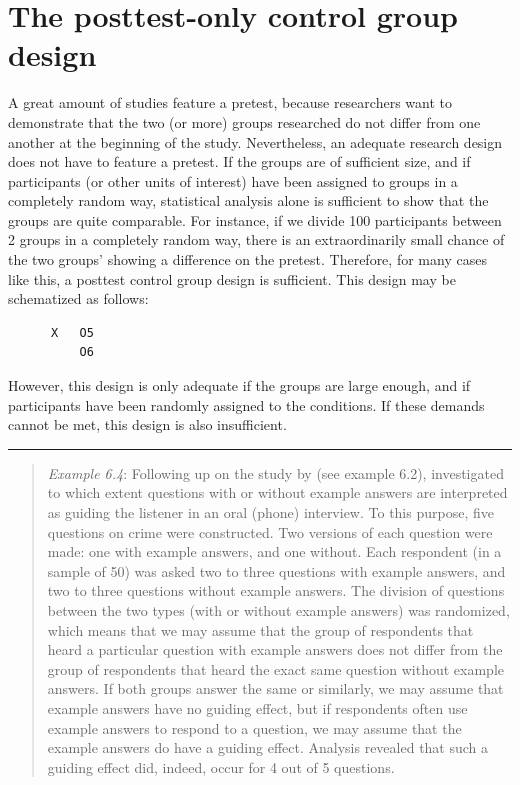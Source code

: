 \documentclass[
]{book}
\begin{document}
\hypertarget{the-posttest-only-control-group-design}{%
\section{The posttest-only control group design}\label{the-posttest-only-control-group-design}}

A great amount of studies feature a pretest, because researchers want to demonstrate that the two (or more) groups researched do not differ from one another at the beginning of the study. Nevertheless, an adequate research design does not have to feature a pretest. If the groups are of sufficient size, and if participants (or other units of interest) have been assigned to groups in a completely random way, statistical analysis alone is sufficient to show that the groups are quite comparable. For instance, if we divide 100 participants between 2 groups in a completely random way, there is an extraordinarily small chance of the two groups' showing a difference on the pretest. Therefore, for many cases like this, a posttest control group design is sufficient. This design may be schematized as follows:

\begin{verbatim}
      X   O5
          O6
\end{verbatim}

However, this design is only adequate if the groups are large enough, and if participants have been randomly assigned to the conditions. If these demands cannot be met, this design is also insufficient.

\begin{center}\rule{0.5\linewidth}{0.5pt}\end{center}

\begin{quote}
\emph{Example 6.4}: Following up on the study by \citet{Houtk91} (see example 6.2), \citet{Wijff92} investigated to which extent questions with or without example answers are interpreted as guiding the listener in an oral (phone) interview. To this purpose, five questions on crime were constructed. Two versions of each question were made: one with example answers, and one without. Each respondent (in a sample of 50) was asked two to three questions with example answers, and two to three questions without example answers. The division of questions between the two types (with or without example answers) was randomized, which means that we may assume that the group of respondents that heard a particular question with example answers does not differ from the group of respondents that heard the exact same question without example answers. If both groups answer the same or similarly, we may assume that example answers have no guiding effect, but if respondents often use example answers to respond to a question, we may assume that the example answers do have a guiding effect. Analysis revealed that such a guiding effect did, indeed, occur for 4 out of 5 questions.
\end{quote}
\end{document}
